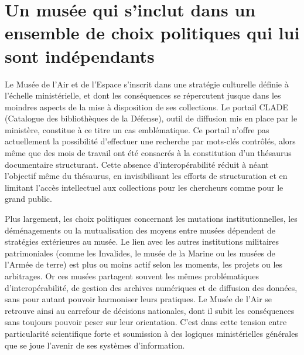 \section{\label{I-B-2}Un musée qui s'inclut dans un ensemble de choix politiques qui lui sont indépendants}

Le Musée de l’Air et de l’Espace s’inscrit dans une stratégie culturelle définie à l’échelle ministérielle, et dont les conséquences se répercutent jusque dans les moindres aspects de la mise à disposition de ses collections. Le portail CLADE (Catalogue des bibliothèques de la Défense), outil de diffusion mis en place par le ministère, constitue à ce titre un cas emblématique. Ce portail n’offre pas actuellement la possibilité d’effectuer une recherche par mots-clés contrôlés, alors même que des mois de travail ont été consacrés à la constitution d’un thésaurus documentaire structurant. Cette absence d’interopérabilité réduit à néant l’objectif même du thésaurus, en invisibilisant les efforts de structuration et en limitant l’accès intellectuel aux collections pour les chercheurs comme pour le grand public.

Plus largement, les choix politiques concernant les mutations institutionnelles, les déménagements ou la mutualisation des moyens entre musées dépendent de stratégies extérieures au musée. Le lien avec les autres institutions militaires patrimoniales (comme les Invalides, le musée de la Marine ou les musées de l’Armée de terre) est plus ou moins actif selon les moments, les projets ou les arbitrages. Or ces musées partagent souvent les mêmes problématiques d’interopérabilité, de gestion des archives numériques et de diffusion des données, sans pour autant pouvoir harmoniser leurs pratiques. Le Musée de l’Air se retrouve ainsi au carrefour de décisions nationales, dont il subit les conséquences sans toujours pouvoir peser sur leur orientation. C’est dans cette tension entre particularité scientifique forte et soumission à des logiques ministérielles générales que se joue l’avenir de ses systèmes d’information.
